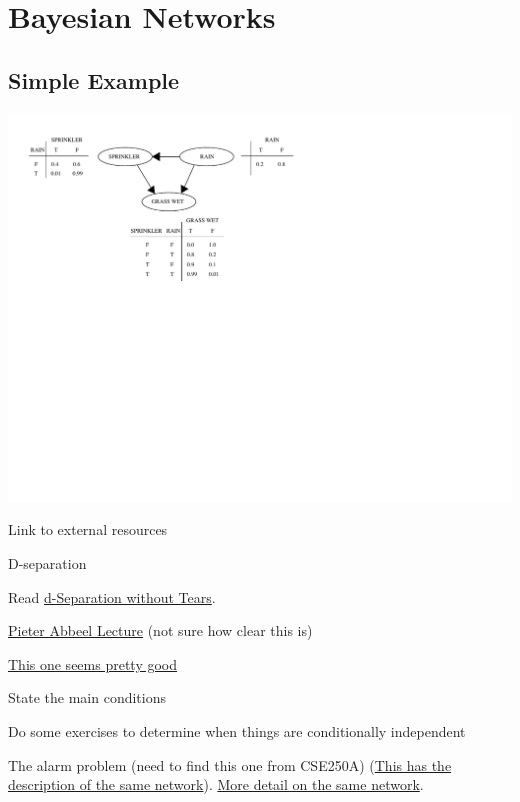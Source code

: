 \documentclass[assignment02_Solutions]{subfiles}
\begin{document}
\section{Bayesian Networks}

\subsection{Simple Example}

\begin{center}
\includegraphics[width=0.7\linewidth]{figures/SimpleBayesNet}
\end{center}

\bi
\item Link to external resources
\item D-separation
\begin{externalresources}
\bi
\item Read \href{http://bayes.cs.ucla.edu/BOOK-09/ch11-1-2-final.pdf}{d-Separation without Tears}.
\item \href{https://www.youtube.com/watch?v=yDs_q6jKHb0}{Pieter Abbeel Lecture} (not sure how clear this is)
\item \href{https://www.youtube.com/watch?v=IjoWqnH6HmU}{This one seems pretty good}
\ei
\end{externalresources}
\item State the main conditions
\item Do some exercises to determine when things are conditionally independent
\ei

\begin{exercise}
The alarm problem (need to find this one from CSE250A) (\href{http://aima.eecs.berkeley.edu/slides-pdf/chapter14a.pdf}{This has the description of the same network}).  \href{https://people.cs.pitt.edu/~milos/courses/cs2740/Lectures/class19.pdf}{More detail on the same network}.
\end{exercise}
\end{document}
